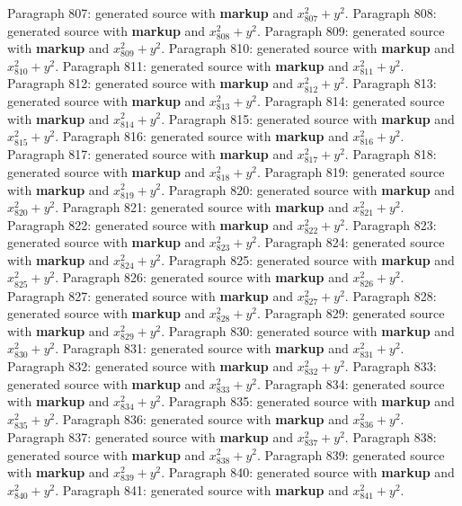 \documentclass{article}
\begin{document}
Paragraph 807: generated source with \textbf{markup} and $x_{807}^2 + y^2$.
Paragraph 808: generated source with \textbf{markup} and $x_{808}^2 + y^2$.
Paragraph 809: generated source with \textbf{markup} and $x_{809}^2 + y^2$.
Paragraph 810: generated source with \textbf{markup} and $x_{810}^2 + y^2$.
Paragraph 811: generated source with \textbf{markup} and $x_{811}^2 + y^2$.
Paragraph 812: generated source with \textbf{markup} and $x_{812}^2 + y^2$.
Paragraph 813: generated source with \textbf{markup} and $x_{813}^2 + y^2$.
Paragraph 814: generated source with \textbf{markup} and $x_{814}^2 + y^2$.
Paragraph 815: generated source with \textbf{markup} and $x_{815}^2 + y^2$.
Paragraph 816: generated source with \textbf{markup} and $x_{816}^2 + y^2$.
Paragraph 817: generated source with \textbf{markup} and $x_{817}^2 + y^2$.
Paragraph 818: generated source with \textbf{markup} and $x_{818}^2 + y^2$.
Paragraph 819: generated source with \textbf{markup} and $x_{819}^2 + y^2$.
Paragraph 820: generated source with \textbf{markup} and $x_{820}^2 + y^2$.
Paragraph 821: generated source with \textbf{markup} and $x_{821}^2 + y^2$.
Paragraph 822: generated source with \textbf{markup} and $x_{822}^2 + y^2$.
Paragraph 823: generated source with \textbf{markup} and $x_{823}^2 + y^2$.
Paragraph 824: generated source with \textbf{markup} and $x_{824}^2 + y^2$.
Paragraph 825: generated source with \textbf{markup} and $x_{825}^2 + y^2$.
Paragraph 826: generated source with \textbf{markup} and $x_{826}^2 + y^2$.
Paragraph 827: generated source with \textbf{markup} and $x_{827}^2 + y^2$.
Paragraph 828: generated source with \textbf{markup} and $x_{828}^2 + y^2$.
Paragraph 829: generated source with \textbf{markup} and $x_{829}^2 + y^2$.
Paragraph 830: generated source with \textbf{markup} and $x_{830}^2 + y^2$.
Paragraph 831: generated source with \textbf{markup} and $x_{831}^2 + y^2$.
Paragraph 832: generated source with \textbf{markup} and $x_{832}^2 + y^2$.
Paragraph 833: generated source with \textbf{markup} and $x_{833}^2 + y^2$.
Paragraph 834: generated source with \textbf{markup} and $x_{834}^2 + y^2$.
Paragraph 835: generated source with \textbf{markup} and $x_{835}^2 + y^2$.
Paragraph 836: generated source with \textbf{markup} and $x_{836}^2 + y^2$.
Paragraph 837: generated source with \textbf{markup} and $x_{837}^2 + y^2$.
Paragraph 838: generated source with \textbf{markup} and $x_{838}^2 + y^2$.
Paragraph 839: generated source with \textbf{markup} and $x_{839}^2 + y^2$.
Paragraph 840: generated source with \textbf{markup} and $x_{840}^2 + y^2$.
Paragraph 841: generated source with \textbf{markup} and $x_{841}^2 + y^2$.
\end{document}
